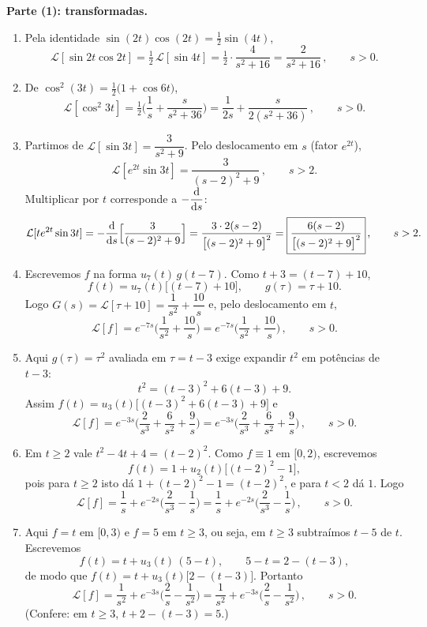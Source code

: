 \medskip
\noindent\textbf{Parte (1): transformadas.}
\begin{enumerate}[label=(\alph*)]

\item Pela identidade $\sin(2t)\cos(2t)=\tfrac12\sin(4t)$,
\[
\mathcal{L}[\sin 2t\cos 2t]=\tfrac12\,\mathcal{L}[\sin 4t]=\tfrac12\cdot\frac{4}{s^2+16}
=\boxed{\dfrac{2}{s^2+16}}\,,\qquad s>0.
\]

\item De $\cos^2(3t)=\tfrac12\big(1+\cos 6t\big)$,
\[
\mathcal{L}[\cos^2 3t]=\tfrac12\Big(\frac1s+\frac{s}{s^2+36}\Big)
=\boxed{\dfrac{1}{2s}+\dfrac{s}{2(s^2+36)}}\,,\qquad s>0.
\]

\item Partimos de $\mathcal{L}[\sin 3t]=\dfrac{3}{s^2+9}$. Pelo deslocamento em $s$ (fator $e^{2t}$),
\[
\mathcal{L}[e^{2t}\sin 3t]=\frac{3}{(s-2)^2+9}\,,\qquad s>2.
\]
Multiplicar por $t$ corresponde a $-\dfrac{\mathrm{d}}{\mathrm{d} s}$:
\[
\mathcal{L}[t e^{2t}\sin 3t]=-\frac{\mathrm{d}}{\mathrm{d} s}\Big[\frac{3}{(s-2)^2+9}\Big]
=\frac{3\cdot 2(s-2)}{\big[(s-2)^2+9\big]^2}
=\boxed{\dfrac{6(s-2)}{\big[(s-2)^2+9\big]^2}}\,,\qquad s>2.
\]

\item Escrevemos $f$ na forma $u_7(t)\,g(t-7)$. Como $t+3=(t-7)+10$,
\[
f(t)=u_7(t)\big[(t-7)+10\big],\qquad g(\tau)=\tau+10.
\]
Logo $G(s)=\mathcal{L}[\tau+10]=\dfrac1{s^2}+\dfrac{10}{s}$ e, pelo deslocamento em $t$,
\[
\mathcal{L}[f]=e^{-7s}\Big(\frac1{s^2}+\frac{10}{s}\Big)
=\boxed{e^{-7s}\Big(\dfrac{1}{s^2}+\dfrac{10}{s}\Big)}\,,\qquad s>0.
\]

\item Aqui $g(\tau)=\tau^2$ avaliada em $\tau=t-3$ exige expandir $t^2$ em potências de $t-3$:
\[
t^2=(t-3)^2+6(t-3)+9.
\]
Assim $f(t)=u_3(t)\big[(t-3)^2+6(t-3)+9\big]$ e
\[
\mathcal{L}[f]=e^{-3s}\Big(\frac{2}{s^3}+\frac{6}{s^2}+\frac{9}{s}\Big)
=\boxed{e^{-3s}\Big(\dfrac{2}{s^3}+\dfrac{6}{s^2}+\dfrac{9}{s}\Big)}\,,\qquad s>0.
\]

\item Em $t\ge 2$ vale $t^2-4t+4=(t-2)^2$. Como $f\equiv 1$ em $[0,2)$, escrevemos
\[
f(t)=1+u_2(t)\big[(t-2)^2-1\big],
\]
pois para $t\ge 2$ isto dá $1+(t-2)^2-1=(t-2)^2$, e para $t<2$ dá $1$. Logo
\[
\mathcal{L}[f]=\frac1s+e^{-2s}\Big(\frac{2}{s^3}-\frac1s\Big)
=\boxed{\dfrac{1}{s}+e^{-2s}\Big(\dfrac{2}{s^3}-\dfrac{1}{s}\Big)}\,,\qquad s>0.
\]

\item Aqui $f=t$ em $[0,3)$ e $f=5$ em $t\ge 3$, ou seja, em $t\ge 3$ subtraímos $t-5$ de $t$. Escrevemos
\[
f(t)=t+u_3(t)\,(5-t),\qquad 5-t=2-(t-3),
\]
de modo que $f(t)=t+u_3(t)\big[2-(t-3)\big]$. Portanto
\[
\mathcal{L}[f]=\frac1{s^2}+e^{-3s}\Big(\frac{2}{s}-\frac1{s^2}\Big)
=\boxed{\dfrac{1}{s^2}+e^{-3s}\Big(\dfrac{2}{s}-\dfrac{1}{s^2}\Big)}\,,\qquad s>0.
\]
(Confere: em $t\ge 3$, $t+2-(t-3)=5$.)


\end{enumerate}
